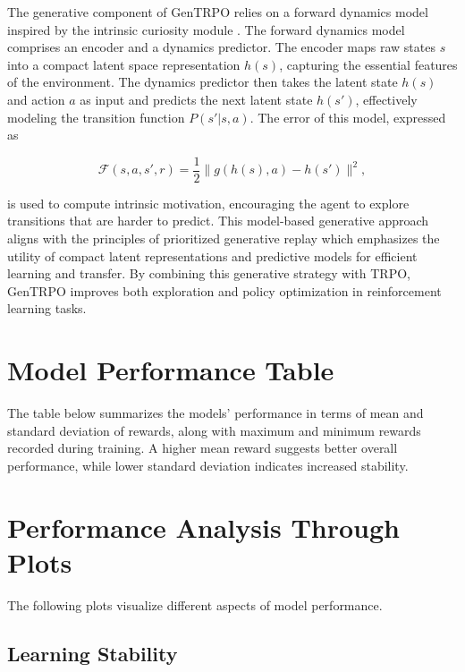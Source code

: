 \documentclass{article}
\begin{document}
The generative component of GenTRPO relies on a forward dynamics model inspired by the intrinsic curiosity module \cite{pathak2017curiositydrivenexplorationselfsupervisedprediction}. The forward dynamics model comprises an encoder and a dynamics predictor. The encoder maps raw states \( s \) into a compact latent space representation \( h(s) \), capturing the essential features of the environment. The dynamics predictor then takes the latent state \( h(s) \) and action \( a \) as input and predicts the next latent state \( h(s') \), effectively modeling the transition function \( P(s' | s, a) \). The error of this model, expressed as 

\[
\mathcal{F}(s, a, s', r) = \frac{1}{2} \| g(h(s), a) - h(s') \|^2,
\]

is used to compute intrinsic motivation, encouraging the agent to explore transitions that are harder to predict. This model-based generative approach aligns with the principles of prioritized generative replay \cite{wang2024prioritizedgenerativereplay} which emphasizes the utility of compact latent representations and predictive models for efficient learning and transfer. By combining this generative strategy with TRPO, GenTRPO improves both exploration and policy optimization in reinforcement learning tasks.


\section{Model Performance Table}

The table below summarizes the models' performance in terms of mean and standard deviation of rewards, along with maximum and minimum rewards recorded during training. A higher mean reward suggests better overall performance, while lower standard deviation indicates increased stability.

\bigskip
\begin{center}
  
\end{center}
\bigskip

\section{Performance Analysis Through Plots}

The following plots visualize different aspects of model performance.

\subsection*{Learning Stability}
\end{document}
